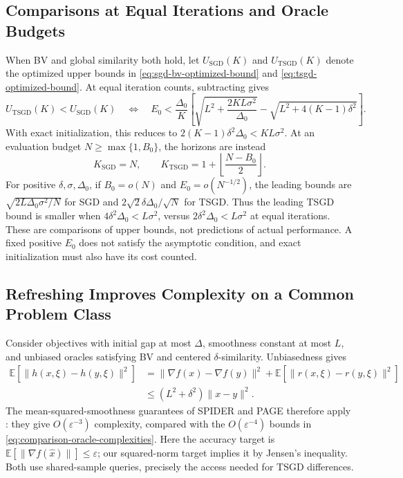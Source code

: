 \subsection{Comparisons at Equal Iterations and Oracle Budgets}
\label{subsec:noise-mechanisms}
\label{subsec:fair-oracle-comparison}

When BV and global similarity both hold, let $U_{\mathrm{SGD}}(K)$
and $U_{\mathrm{TSGD}}(K)$ denote the optimized upper bounds in
\eqref{eq:sgd-bv-optimized-bound} and \eqref{eq:tsgd-optimized-bound}.
At equal iteration counts, subtracting gives
\begin{equation}
\label{eq:optimized-certificate-comparison}
U_{\mathrm{TSGD}}(K)<U_{\mathrm{SGD}}(K)
\quad\Longleftrightarrow\quad
E_0<\frac{\Delta_0}{K}
\left[\sqrt{L^2+\frac{2KL\sigma^2}{\Delta_0}}
-\sqrt{L^2+4(K-1)\delta^2}\right].
\end{equation}
With exact initialization, this reduces to
$2(K-1)\delta^2\Delta_0<KL\sigma^2$.
At an evaluation budget $N\geq\max\{1,B_0\}$, the horizons are instead
\begin{equation}
\label{eq:equal-budget-horizons}
K_{\mathrm{SGD}}=N,\qquad
K_{\mathrm{TSGD}}=1+\left\lfloor\frac{N-B_0}{2}\right\rfloor.
\end{equation}
For positive $\delta,\sigma,\Delta_0$, if $B_0=o(N)$ and
$E_0=o(N^{-1/2})$, the leading bounds are
$\sqrt{2L\Delta_0\sigma^2/N}$ for SGD and
$2\sqrt2\delta\Delta_0/\sqrt N$ for TSGD.
Thus the leading TSGD bound is smaller when
$4\delta^2\Delta_0<L\sigma^2$, versus
$2\delta^2\Delta_0<L\sigma^2$ at equal iterations.
These are comparisons of upper bounds, not predictions of actual
performance. A fixed positive $E_0$ does not satisfy the asymptotic
condition, and exact initialization must also have its cost counted.

\subsection{Refreshing Improves Complexity on a Common Problem Class}
\label{app:common-class-lower-bound}

Consider objectives with initial gap at most $\Delta$, smoothness
constant at most $L$, and unbiased oracles satisfying BV and centered
$\delta$-similarity. Unbiasedness gives
\begin{equation}
\label{eq:similarity-implies-mean-square-smoothness}
\begin{aligned}
\mathbb E[\|h(x,\xi)-h(y,\xi)\|^2]
&=\|\nabla f(x)-\nabla f(y)\|^2
  +\mathbb E[\|r(x,\xi)-r(y,\xi)\|^2]\\
&\leq(L^2+\delta^2)\|x-y\|^2.
\end{aligned}
\end{equation}
The mean-squared-smoothness guarantees of SPIDER and PAGE therefore
apply \citep{fang2018spider,li2021page}: they give
$O(\varepsilon^{-3})$ complexity, compared with the
$O(\varepsilon^{-4})$ bounds in \eqref{eq:comparison-oracle-complexities}.
Here the accuracy target is
$\mathbb E[\|\nabla f(\widehat x)\|]\leq\varepsilon$; our squared-norm
target implies it by Jensen's inequality. Both use shared-sample
queries, precisely the access needed for TSGD differences.

